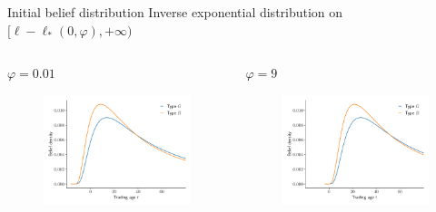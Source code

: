\documentclass{beamer}
\begin{document}
\begin{frame}{Initial belief distribution}
	Inverse exponential distribution on
	$[\ell - \ell_*(0, \varphi), +\infty)$

	\begin{columns}[t]
		\begin{column}{0.49\textwidth}
			\begin{block}{$\varphi = 0.01$}
				\begin{figure}
					\includegraphics[width=\linewidth]{figures/ldist1}
				\end{figure}
			\end{block}
		\end{column}

		\begin{column}{0.49\textwidth}
			\begin{block}{$\varphi = 9$}
				\begin{figure}
					\includegraphics[width=\linewidth]{figures/ldist2}
				\end{figure}
			\end{block}
		\end{column}
	\end{columns}
\end{frame}
\end{document}
